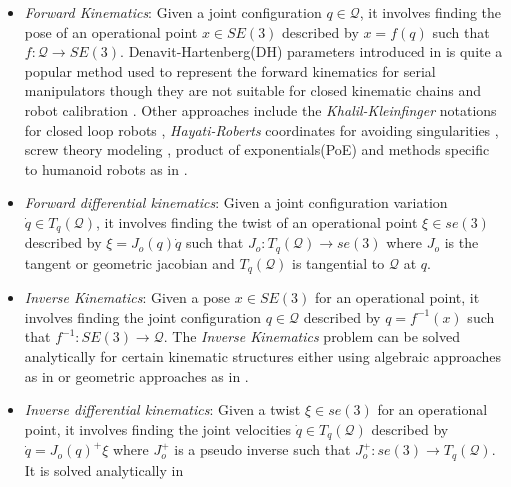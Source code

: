 \begin{itemize}
    \item \textit{Forward Kinematics}: Given a joint configuration $q \in \mathcal{Q}$, it involves finding the pose of an operational point $x \in SE(3)$ described by $x = f(q)$ such that $f:\mathcal{Q} \rightarrow SE(3)$. Denavit-Hartenberg(DH) parameters \cite{hartenberg1955kinematic} introduced in \cite{craig2005introduction} is quite a popular method used to represent the forward kinematics for serial manipulators though they are not suitable for closed kinematic chains and robot calibration \cite{khalil2004modeling,everett1987kinematic}. Other approaches include the \textit{Khalil-Kleinfinger} notations for closed loop robots \cite{khalil2004modeling}, \textit{Hayati-Roberts} coordinates for avoiding singularities \cite{hayati1985improving, roberts1988new}, screw theory modeling \cite{tsai1999robot}, product of exponentials(PoE) \cite{park1994computational} and methods 
    specific to humanoid robots as in \cite{kajita2005humanoid}.

    \item \textit{Forward differential kinematics}: Given a joint configuration variation $\dot{q} \in T_q(\mathcal{Q})$, it involves finding the twist of an operational point $\xi \in se(3)$ described by  $\xi = J_o(q)\dot{q}$ such that  $J_o:T_q(\mathcal{Q}) \rightarrow se(3)$ where $J_o$ is the tangent or geometric jacobian \cite{spong2006robot,Khatib1987} and $T_q(\mathcal{Q})$ is tangential to $\mathcal{Q}$ at $q$.
    \item \textit{Inverse Kinematics}: Given a pose $x \in SE(3)$ for an operational point, it involves finding the joint configuration
    $ q \in \mathcal{Q}$ described by $q = f^{-1}(x)$ such that $f^{-1}:SE(3) \rightarrow \mathcal{Q} $. The \textit{Inverse Kinematics} problem can be solved analytically for certain kinematic structures either using algebraic approaches as in \cite{paul1robot} \cite{RaghvanBoth1993inverse} or geometric approaches as in \cite{paden1985kinematics, peiper1968kinematics}.

    \item \textit{Inverse differential kinematics}: Given a twist $\xi \in se(3)$ for an operational point, it involves finding the 
    joint velocities $\dot{q} \in T_q(\mathcal{Q})$ described by $ \dot{q} = J_o(q)^{+}\xi$ where $J_o^{+}$ is a pseudo inverse such that $J_o^{+}:se(3) \rightarrow T_q (\mathcal{Q})$. It is solved analytically in \cite{Chiaverini1994,Chiaverini1997,siciliano1999tricept}  

\end{itemize}

